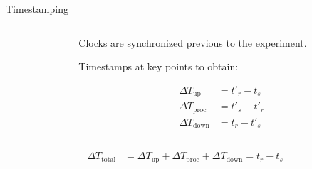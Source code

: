 \documentclass[aspectratio=1610]{beamer}
\begin{document}
\begin{frame}{Timestamping}
    \begin{columns}[onlytextwidth]
        \begin{column}{.5\linewidth}
            \footnotesize%
            \raggedright%
            
        \end{column}%
        \begin{column}{.5\linewidth}
            Clocks are synchronized previous to the experiment.

            \vspace{\baselineskip}%
            Timestamps at key points to obtain:

            \begin{align}
                {\Delta}T_\text{up} &= t'_{r} - t_{s}\\
                {\Delta}T_\text{proc} &= t'_{s} - t'_{r}\\
                {\Delta}T_\text{down} &= t_{r} - t'_{s}
            \end{align}
        \end{column}%
    \end{columns}
    \begin{align}
        {\Delta}T_\text{total} &= {\Delta}T_\text{up} + {\Delta}T_\text{proc} + {\Delta}T_\text{down} = t_{r} - t_{s}
    \end{align}
\end{frame}
\end{document}

